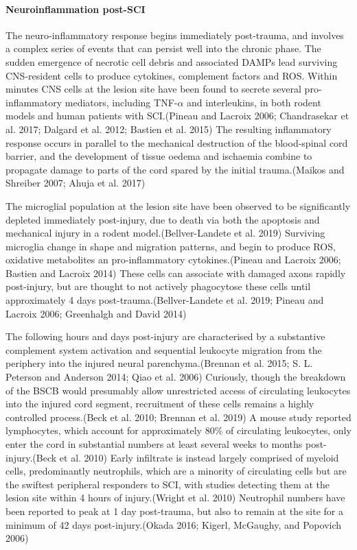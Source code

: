 \documentclass[9pt,lineno]{elife}
\begin{document}
\begin{landscape}
\begin{landscape}
\hypertarget{neuroinflammation-post-sci}{%
\paragraph{Neuroinflammation post-SCI}\label{neuroinflammation-post-sci}}

The neuro-inflammatory response begins immediately post-trauma, and involves a complex series of events that can persist well into the chronic phase.
The sudden emergence of necrotic cell debris and associated DAMPs lead surviving CNS-resident cells to produce cytokines, complement factors and ROS.
Within minutes CNS cells at the lesion site have been found to secrete several pro-inflammatory mediators, including TNF-\(\alpha\) and interleukins, in both rodent models and human patients with SCI.(Pineau and Lacroix 2006; Chandrasekar et al. 2017; Dalgard et al. 2012; Bastien et al. 2015) The resulting inflammatory response occurs in parallel to the mechanical destruction of the blood-spinal cord barrier, and the development of tissue oedema and ischaemia combine to propagate damage to parts of the cord spared by the initial trauma.(Maikos and Shreiber 2007; Ahuja et al. 2017)

The microglial population at the lesion site have been observed to be significantly depleted immediately post-injury, due to death via both the apoptosis and mechanical injury in a rodent model.(Bellver-Landete et al. 2019) Surviving microglia change in shape and migration patterns, and begin to produce ROS, oxidative metabolites an pro-inflammatory cytokines.(Pineau and Lacroix 2006; Bastien and Lacroix 2014) These cells can associate with damaged axons rapidly post-injury, but are thought to not actively phagocytose these cells until approximately 4 days post-trauma.(Bellver-Landete et al. 2019; Pineau and Lacroix 2006; Greenhalgh and David 2014)

The following hours and days post-injury are characterised by a substantive complement system activation and sequential leukocyte migration from the periphery into the injured neural parenchyma.(Brennan et al. 2015; S. L. Peterson and Anderson 2014; Qiao et al. 2006) Curiously, though the breakdown of the BSCB would presumably allow unrestricted access of circulating leukocytes into the injured cord segment, recruitment of these cells remains a highly controlled process.(Beck et al. 2010; Brennan et al. 2019) A mouse study reported lymphocytes, which account for approximately 80\% of circulating leukocytes, only enter the cord in substantial numbers at least several weeks to months post-injury.(Beck et al. 2010) Early infiltrate is instead largely comprised of myeloid cells, predominantly neutrophils, which are a minority of circulating cells but are the swiftest peripheral responders to SCI, with studies detecting them at the lesion site within 4 hours of injury.(Wright et al. 2010) Neutrophil numbers have been reported to peak at 1 day post-trauma, but also to remain at the site for a minimum of 42 days post-injury.(Okada 2016; Kigerl, McGaughy, and Popovich 2006)


\end{landscape}
\end{landscape}
\end{document}
